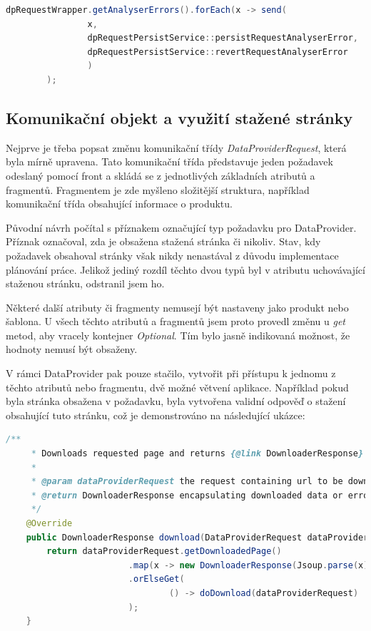 \documentclass[thesis=B,czech]{FITthesis}[2012/06/26]
\begin{document}
\begin{lstlisting}[language=Java, caption={Příklad zavolání metody odesílající požadavky}]
        dpRequestWrapper.getAnalyserErrors().forEach(x -> send(
                x,
                dpRequestPersistService::persistRequestAnalyserError,
                dpRequestPersistService::revertRequestAnalyserError
                )
        );
\end{lstlisting}

\subsection{Komunikační objekt a využití stažené stránky}
Nejprve je třeba popsat změnu komunikační třídy \textit{DataProviderRequest}, která byla mírně upravena.
Tato komunikační třída představuje jeden požadavek odeslaný pomocí front a skládá se z jednotlivých základních atributů a fragmentů.
Fragmentem je zde myšleno složitější struktura, například komunikační třída obsahující informace o produktu.
\par
Původní návrh počítal s příznakem označující typ požadavku pro DataProvider. Příznak označoval, zda je obsažena stažená stránka či nikoliv. Stav, kdy požadavek obsahoval stránky však nikdy nenastával z důvodu implementace plánování práce. Jelikož jediný rozdíl těchto dvou typů byl v atributu uchovávající staženou stránku, odstranil jsem ho.
\par
Některé další atributy či fragmenty nemusejí být nastaveny jako produkt nebo šablona. U všech těchto atributů a fragmentů jsem proto provedl změnu u \textit{get} metod, aby vracely kontejner \textit{Optional}. Tím bylo jasně indikovaná možnost, že hodnoty nemusí být obsaženy.
\par
V rámci DataProvider pak pouze stačilo, vytvořit při přístupu k jednomu z těchto atributů nebo fragmentu, dvě možné větvení aplikace.
Například pokud byla stránka obsažena v požadavku, byla vytvořena validní odpověď o stažení obsahující tuto stránku, což je demonstrováno na 
následující ukázce:
\begin{lstlisting}[language=Java, caption={Veřejná metoda třídy \textit{DPDownloaderServiceImpl} zajišťující stažení stránky obsahující detail produktu}]
    /**
     * Downloads requested page and returns {@link DownloaderResponse} object.
     *
     * @param dataProviderRequest the request containing url to be downloaded
     * @return DownloaderResponse encapsulating downloaded data or error
     */
    @Override
    public DownloaderResponse download(DataProviderRequest dataProviderRequest) {
        return dataProviderRequest.getDownloadedPage()
                        .map(x -> new DownloaderResponse(Jsoup.parse(x)))
                        .orElseGet(
                                () -> doDownload(dataProviderRequest)
                        );
    }
\end{lstlisting}
\end{document}
